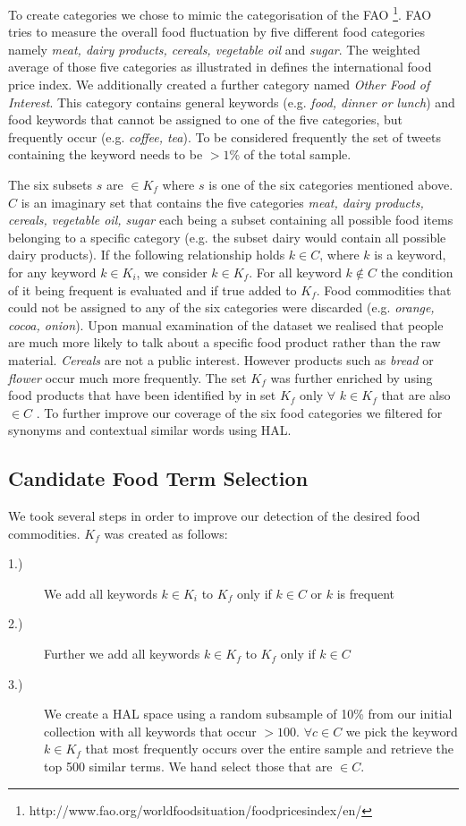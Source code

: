 To create categories we chose to mimic the categorisation of the FAO  \footnote{http://www.fao.org/worldfoodsituation/foodpricesindex/en/}. FAO tries to measure the overall food fluctuation by five different food categories namely \emph{meat, dairy products, cereals, vegetable oil} and \emph {sugar}. The weighted average of those five categories as illustrated in \cite{fao13}  defines the international food price index. We additionally created a further category named \emph{Other Food of Interest}. This category contains general keywords (e.g. \emph{food, dinner or lunch}) and food keywords that cannot be assigned to one of the five categories, but frequently occur (e.g. \emph {coffee, tea}). To be considered frequently the set of tweets containing the keyword needs to be $> 1\%$ of the total sample. 

The six subsets  $s$ are $\in K_f$ where $s$ is one of the six categories mentioned above. $C$ is an imaginary set that contains the five categories \emph{meat, dairy products, cereals, vegetable oil, sugar}  each being a subset containing all possible food items belonging to a specific category (e.g. the subset dairy would contain all possible dairy products). If the following relationship holds  $k \in C$, where $k$ is a keyword, for any keyword $k \in K_i$, we consider $k \in K_f$. For all keyword $k \notin C$ the condition of it being frequent is evaluated and if true added to $K_f$.  Food commodities that could not be assigned to any of the six categories were discarded (e.g. \emph {orange, cocoa, onion}). Upon manual examination of the dataset we realised that people are much more likely to talk about a specific food product rather than the raw material. \emph{Cereals} are not a public interest. However products such as \emph{bread} or \emph {flower} occur much more frequently. The set $K_f$  was further enriched by using food products that have been identified by \cite{AbbarMW14} in set $K_f$ only $\forall$ $k   \in K_f$ that are also $\in C$ . To further improve our coverage of the six food categories we filtered for synonyms and contextual similar words using HAL. 

\subsection{Candidate Food Term Selection}

We took several  steps in order to improve our detection of the desired food commodities. $K_f$ was created as follows: 
\begin{description}
  \item[1.)] We add all keywords $k \in K_i$ to  $K_f$ only if $k \in C $ or $k$ is frequent 
  \item[2.)] Further we add all keywords $ k \in K_f$ to $K_f$ only if $k \in C$
  \item[3.)] We create a HAL space using a random subsample of 10\% from our initial collection with all keywords that occur $> 100$. $\forall c \in C $ we pick the keyword $k\in K_f$ that most frequently occurs over the entire sample and retrieve the top 500 similar terms. We hand select those that are $\in C$.
\end{description}

